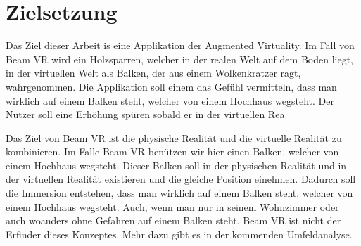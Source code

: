 \section{Zielsetzung}\label{sec: objective}

Das Ziel dieser Arbeit is eine Applikation der Augmented Virtuality.
Im Fall von Beam VR wird ein Holzsparren, welcher in der realen Welt auf dem Boden liegt, in der virtuellen Welt als Balken, der aus einem Wolkenkratzer ragt, wahrgenommen.
Die Applikation soll einem das Gefühl vermitteln, dass man wirklich auf einem Balken steht, welcher von einem Hochhaus wegsteht.
Der Nutzer soll eine Erhöhung spüren sobald er in der virtuellen Rea



Das Ziel von Beam VR ist die physische Realität und die virtuelle Realität zu kombinieren.
Im Falle Beam VR benützen wir hier einen Balken, welcher von einem Hochhaus wegsteht.
Dieser Balken soll in der physischen Realität und in der virtuellen Realität existieren und die gleiche Position einehmen.
Dadurch soll die Immersion entstehen, dass man wirklich auf einem Balken steht, welcher von einem Hochhaus wegsteht.
Auch, wenn man nur in seinem Wohnzimmer oder auch woanders ohne Gefahren auf einem Balken steht.
Beam VR ist nicht der Erfinder dieses Konzeptes.
Mehr dazu gibt es in der kommenden Umfeldanalyse.

